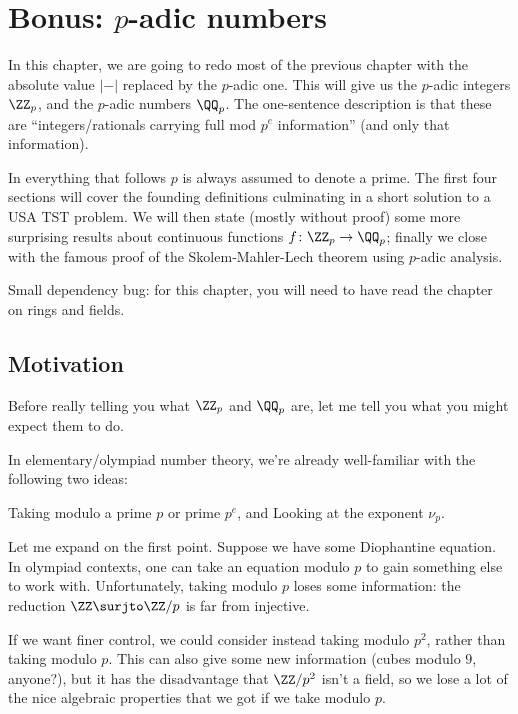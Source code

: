 \chapter[Bonus: p-adic numbers]{Bonus: $p$-adic numbers}
In this chapter, we are going to redo most of the previous chapter
with the absolute value $\left\lvert - \right\rvert$
replaced by the $p$-adic one.
This will give us the $p$-adic integers $\ZZ_p$,
and the $p$-adic numbers $\QQ_p$.
The one-sentence description is that these are
``integers/rationals carrying full mod $p^e$ information''
(and only that information).

In everything that follows $p$ is always assumed to denote a prime.
The first four sections will cover the founding definitions
culminating in a short solution to a USA TST problem.
We will then state (mostly without proof) some more
surprising results about continuous functions $f \colon \ZZ_p \to \QQ_p$;
finally we close with the famous proof of the Skolem-Mahler-Lech theorem
using $p$-adic analysis.

Small dependency bug: for this chapter,
you will need to have read the chapter on rings and fields.


\section{Motivation}
Before really telling you what $\ZZ_p$ and $\QQ_p$ are,
let me tell you what you might expect them to do.

In elementary/olympiad number theory,
we're already well-familiar with the following two ideas:
\begin{itemize}
	\ii Taking modulo a prime $p$ or prime $p^e$, and
	\ii Looking at the exponent $\nu_p$.
\end{itemize}

Let me expand on the first point.
Suppose we have some Diophantine equation.
In olympiad contexts, one can take an equation modulo $p$
to gain something else to work with.
Unfortunately, taking modulo $p$ loses some information:
the reduction $\ZZ \surjto \ZZ/p$ is far from injective.

If we want finer control, we could consider instead
taking modulo $p^2$, rather than taking modulo $p$.
This can also give some new information (cubes modulo $9$, anyone?),
but it has the disadvantage that $\ZZ/p^2$ isn't a field,
so we lose a lot of the nice algebraic properties that we
got if we take modulo $p$.

